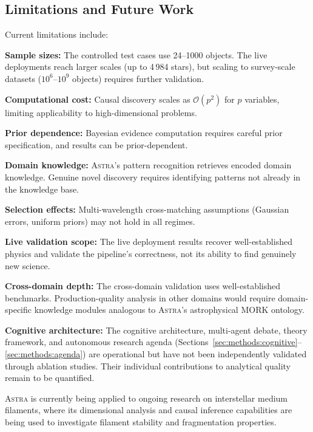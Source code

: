 \documentclass[usenatbib]{rasti}
\newcommand{\astra}{\textsc{Astra}\xspace}
\begin{document}
\subsection{Limitations and Future Work}
\label{sec:discussion:limitations}

Current limitations include:
\begin{description}
  \item \textbf{Sample sizes:} The controlled test cases use 24--1000 objects. The live deployments reach larger scales (up to 4\,984 stars), but scaling to survey-scale datasets ($10^{6}$--$10^{9}$ objects) requires further validation.
  \item \textbf{Computational cost:} Causal discovery scales as $\mathcal{O}(p^2)$ for $p$ variables, limiting applicability to high-dimensional problems.
  \item \textbf{Prior dependence:} Bayesian evidence computation requires careful prior specification, and results can be prior-dependent.
  \item \textbf{Domain knowledge:} \astra's pattern recognition retrieves encoded domain knowledge. Genuine novel discovery requires identifying patterns not already in the knowledge base.
  \item \textbf{Selection effects:} Multi-wavelength cross-matching assumptions (Gaussian errors, uniform priors) may not hold in all regimes.
  \item \textbf{Live validation scope:} The live deployment results recover well-established physics and validate the pipeline's correctness, not its ability to find genuinely new science.
  \item \textbf{Cross-domain depth:} The cross-domain validation uses well-established benchmarks. Production-quality analysis in other domains would require domain-specific knowledge modules analogous to \astra's astrophysical MORK ontology.
  \item \textbf{Cognitive architecture:} The cognitive architecture, multi-agent debate, theory framework, and autonomous research agenda (Sections~\ref{sec:methods:cognitive}--\ref{sec:methods:agenda}) are operational but have not been independently validated through ablation studies. Their individual contributions to analytical quality remain to be quantified.
\end{description}

\astra is currently being applied to ongoing research on interstellar medium filaments, where its dimensional analysis and causal inference capabilities are being used to investigate filament stability and fragmentation properties.
\end{document}
